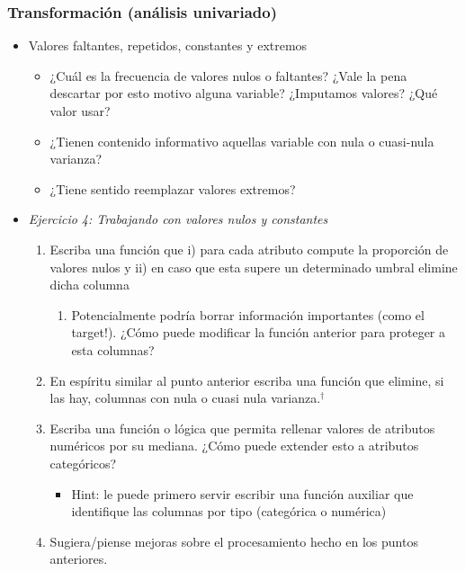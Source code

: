 \documentclass[leqno, 10pt, envcountsect]{beamer}
\numberwithin{equation}{section}
\theoremstyle{definition}
\theoremstyle{example}
\numberwithin{figure}{section}
\numberwithin{table}{section}
\let\olditem\item
\renewcommand{\item}{%
\olditem\vspace{1pt}}
\begin{document}
\begin{frame}[fragile=singleslide]
  \frametitle{Transformación (análisis univariado)}
  \begin{itemize}
    \item Valores faltantes, repetidos, constantes y extremos
    \begin{itemize}
        \item  ¿Cuál es la frecuencia de valores
          nulos o faltantes? ¿Vale la pena descartar por esto motivo alguna
          variable? ¿Imputamos valores? ¿Qué valor usar?
        \item ¿Tienen contenido informativo aquellas variable con nula o
          cuasi-nula varianza?
        \item ¿Tiene sentido reemplazar valores extremos?
  \end{itemize}
  \item \textit{Ejercicio 4: Trabajando con valores nulos y constantes}
    \begin{enumerate}
      \item Escriba una función que i) para cada atributo compute la proporción de
        valores nulos y ii) en caso que esta supere un determinado umbral
        elimine dicha columna
        \begin{enumerate}
          \item Potencialmente podría borrar información importantes (como el
            target!). ¿Cómo puede modificar la función anterior para proteger a
            esta columnas?
        \end{enumerate}
      \item En espíritu similar al punto anterior escriba una función que elimine,
        si las hay, columnas con nula o
        cuasi nula varianza.$^{\dag}$
      \item Escriba una función o lógica que permita rellenar valores de
        atributos numéricos por su mediana. ¿Cómo puede extender esto a
        atributos categóricos? %
        \begin{itemize}
          \item Hint: le puede primero servir escribir una función auxiliar que
            identifique las columnas por tipo (categórica o numérica)
        \end{itemize}
      \item Sugiera/piense mejoras sobre el procesamiento hecho en los puntos
        anteriores. %
    \end{enumerate}
  \end{itemize}
\end{frame}
\end{document}
